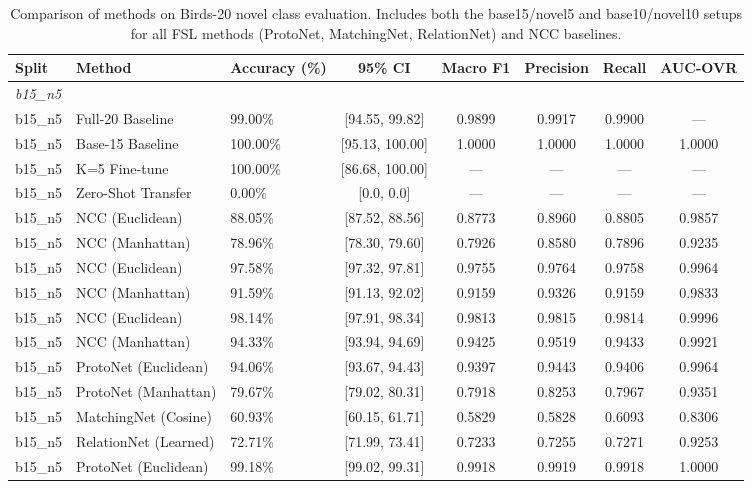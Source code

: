 \begin{table}[htbp]
\centering
\caption{Comparison of methods on Birds-20 novel class evaluation. Includes both the base15/novel5 and base10/novel10 setups for all FSL methods (ProtoNet, MatchingNet, RelationNet) and NCC baselines.}
\label{tab:results_comparison}
\begin{tabular}{lllccccc}
\hline
\textbf{Split} & \textbf{Method} & \textbf{Accuracy (\%)} & \textbf{95\% CI} & \textbf{Macro F1} & \textbf{Precision} & \textbf{Recall} & \textbf{AUC-OVR} \\
\hline
\multicolumn{8}{l}{\textit{b15\_n5}} \\
b15\_n5 & Full-20 Baseline & 99.00\% & [94.55, 99.82] & 0.9899 & 0.9917 & 0.9900 & --- \\
b15\_n5 & Base-15 Baseline & 100.00\% & [95.13, 100.00] & 1.0000 & 1.0000 & 1.0000 & 1.0000 \\
b15\_n5 & K=5 Fine-tune & 100.00\% & [86.68, 100.00] & --- & --- & --- & --- \\
b15\_n5 & Zero-Shot Transfer & 0.00\% & [0.0, 0.0] & --- & --- & --- & --- \\
b15\_n5 & NCC (Euclidean) & 88.05\% & [87.52, 88.56] & 0.8773 & 0.8960 & 0.8805 & 0.9857 \\
b15\_n5 & NCC (Manhattan) & 78.96\% & [78.30, 79.60] & 0.7926 & 0.8580 & 0.7896 & 0.9235 \\
b15\_n5 & NCC (Euclidean) & 97.58\% & [97.32, 97.81] & 0.9755 & 0.9764 & 0.9758 & 0.9964 \\
b15\_n5 & NCC (Manhattan) & 91.59\% & [91.13, 92.02] & 0.9159 & 0.9326 & 0.9159 & 0.9833 \\
b15\_n5 & NCC (Euclidean) & 98.14\% & [97.91, 98.34] & 0.9813 & 0.9815 & 0.9814 & 0.9996 \\
b15\_n5 & NCC (Manhattan) & 94.33\% & [93.94, 94.69] & 0.9425 & 0.9519 & 0.9433 & 0.9921 \\
b15\_n5 & ProtoNet (Euclidean) & 94.06\% & [93.67, 94.43] & 0.9397 & 0.9443 & 0.9406 & 0.9964 \\
b15\_n5 & ProtoNet (Manhattan) & 79.67\% & [79.02, 80.31] & 0.7918 & 0.8253 & 0.7967 & 0.9351 \\
b15\_n5 & MatchingNet (Cosine) & 60.93\% & [60.15, 61.71] & 0.5829 & 0.5828 & 0.6093 & 0.8306 \\
b15\_n5 & RelationNet (Learned) & 72.71\% & [71.99, 73.41] & 0.7233 & 0.7255 & 0.7271 & 0.9253 \\
b15\_n5 & ProtoNet (Euclidean) & 99.18\% & [99.02, 99.31] & 0.9918 & 0.9919 & 0.9918 & 1.0000 \\

\end{tabular}
\end{table}

